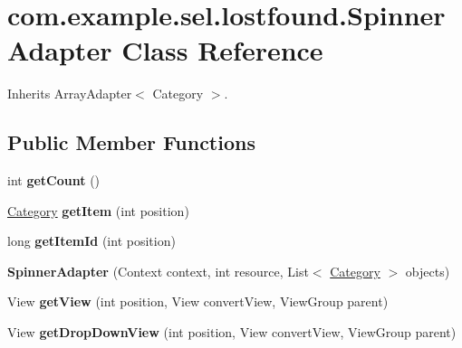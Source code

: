\hypertarget{classcom_1_1example_1_1sel_1_1lostfound_1_1SpinnerAdapter}{\section{com.\-example.\-sel.\-lostfound.\-Spinner\-Adapter \-Class \-Reference}
\label{classcom_1_1example_1_1sel_1_1lostfound_1_1SpinnerAdapter}
}


\-Inherits \-Array\-Adapter$<$ Category $>$.

\subsection*{\-Public \-Member \-Functions}
\begin{DoxyCompactItemize}
\item 
\hypertarget{classcom_1_1example_1_1sel_1_1lostfound_1_1SpinnerAdapter_a9ee3f8a3ee4642cc4379a4fc710a4484}{int {\bfseries get\-Count} ()}\label{classcom_1_1example_1_1sel_1_1lostfound_1_1SpinnerAdapter_a9ee3f8a3ee4642cc4379a4fc710a4484}

\item 
\hypertarget{classcom_1_1example_1_1sel_1_1lostfound_1_1SpinnerAdapter_a48949a737b70991a11fe5f45e6c0b6c1}{\hyperlink{classcom_1_1example_1_1sel_1_1lostfound_1_1Category}{\-Category} {\bfseries get\-Item} (int position)}\label{classcom_1_1example_1_1sel_1_1lostfound_1_1SpinnerAdapter_a48949a737b70991a11fe5f45e6c0b6c1}

\item 
\hypertarget{classcom_1_1example_1_1sel_1_1lostfound_1_1SpinnerAdapter_a248484bdf819294d3bdc8f6db635c673}{long {\bfseries get\-Item\-Id} (int position)}\label{classcom_1_1example_1_1sel_1_1lostfound_1_1SpinnerAdapter_a248484bdf819294d3bdc8f6db635c673}

\item 
\hypertarget{classcom_1_1example_1_1sel_1_1lostfound_1_1SpinnerAdapter_a9cbc724bbe142a941090cc9bf5b8bcb6}{{\bfseries \-Spinner\-Adapter} (\-Context context, int resource, \-List$<$ \hyperlink{classcom_1_1example_1_1sel_1_1lostfound_1_1Category}{\-Category} $>$ objects)}\label{classcom_1_1example_1_1sel_1_1lostfound_1_1SpinnerAdapter_a9cbc724bbe142a941090cc9bf5b8bcb6}

\item 
\hypertarget{classcom_1_1example_1_1sel_1_1lostfound_1_1SpinnerAdapter_ac19132459aeaef196c367a156bb03e0e}{\-View {\bfseries get\-View} (int position, \-View convert\-View, \-View\-Group parent)}\label{classcom_1_1example_1_1sel_1_1lostfound_1_1SpinnerAdapter_ac19132459aeaef196c367a156bb03e0e}

\item 
\hypertarget{classcom_1_1example_1_1sel_1_1lostfound_1_1SpinnerAdapter_a338cec7659aa976e986e4d1c843d4041}{\-View {\bfseries get\-Drop\-Down\-View} (int position, \-View convert\-View, \-View\-Group parent)}\label{classcom_1_1example_1_1sel_1_1lostfound_1_1SpinnerAdapter_a338cec7659aa976e986e4d1c843d4041}

\end{DoxyCompactItemize}


